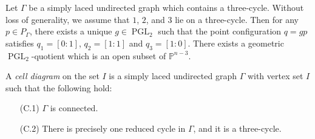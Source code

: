 \documentclass[11pt, a4paper]{amsart}
\begin{document}
	\begin{rem}
		Let \(\Gamma\) be a simply laced undirected graph which contains a three-cycle. Without loss of generality, we assume that \(1\), \(2\), and \(3\) lie on a three-cycle. 
		Then for any \(p \in P_\Gamma\), there exists a unique \(g \in \operatorname{PGL}_2\) such that the point configuration \(q = gp\) satisfies \(q_1 = [0:1]\), \(q_2 = [1:1]\) and \(q_3 = [1:0]\). 
		There exists a geometric \(\operatorname{PGL}_2\)-quotient which is an open subset of \(\mathbb{P}^{n-3}\).
	\end{rem}

	\begin{defn}
		A \emph{cell diagram} on the set \(I\) is a simply laced undirected graph \(\Gamma\) with vertex set \(I\) such that the following hold:
		\begin{enumerate}
			\item[(C.1)] \(\Gamma\) is connected.
			\item[(C.2)] There is precisely one reduced cycle in \(\Gamma\), and it is a three-cycle. 
		\end{enumerate}
	\end{defn}
\end{document}
